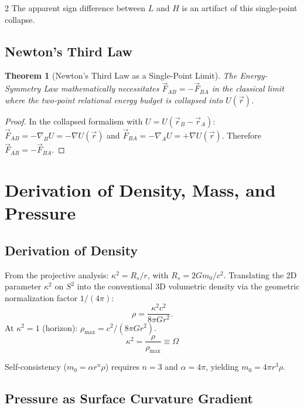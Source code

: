 \documentclass[10pt, a4paper]{article}
\newtheorem{theorem}{Theorem}[section]
\begin{document}
\begin{multicols}{2}
The apparent sign difference between $L$ and $H$ is an artifact of this single-point collapse.

\subsection{Newton's Third Law}
\hypertarget{thm:third_law}{}\label{thm:third_law}

\begin{theorem}[Newton's Third Law as a Single-Point Limit]
The Energy-Symmetry Law mathematically necessitates $\vec{F}_{AB} = -\vec{F}_{BA}$ in the classical limit where the two-point relational energy budget is collapsed into $U(\vec{r})$.
\end{theorem}

\begin{proof}
In the collapsed formalism with $U = U(\vec{r}_B - \vec{r}_A)$: $\vec{F}_{AB} = -\nabla_B U = -\nabla U(\vec{r})$ and $\vec{F}_{BA} = -\nabla_A U = +\nabla U(\vec{r})$. Therefore $\vec{F}_{AB} = -\vec{F}_{BA}$.
\end{proof}



\section{Derivation of Density, Mass, and Pressure}

\subsection{Derivation of Density}
\hypertarget{sec:density}{}\label{sec:density}

From the projective analysis: $\kappa^2 = R_s/r$, with $R_s = 2Gm_0/c^2$. Translating the 2D parameter $\kappa^2$ on $S^2$ into the conventional 3D volumetric density via the geometric normalization factor $1/(4\pi)$:
\[
\rho = \frac{\kappa^2c^2}{8\pi G r^2}.
\]
At $\kappa^2 = 1$ (horizon): $\rho_{\max} = c^2/(8\pi G r^2)$.
\hypertarget{lem:norm_id}{}\label{lem:norm_id}
\[
\boxed{\kappa^2 = \frac{\rho}{\rho_{\max}} \equiv \Omega}
\]

Self-consistency ($m_0 = \alpha r^n \rho$) requires $n=3$ and $\alpha=4\pi$, yielding $m_0 = 4\pi r^3\rho$.

\subsection{Pressure as Surface Curvature Gradient}
\hypertarget{sec:pressure}{}\label{sec:pressure}


\end{multicols}
\end{document}

